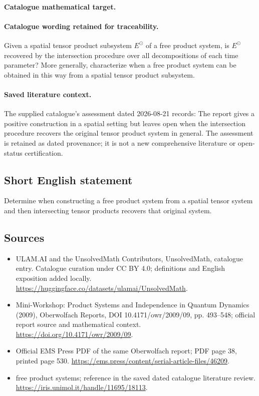 \documentclass[11pt]{article}
\begin{document}
\paragraph{Catalogue mathematical target.}
\paragraph{Catalogue wording retained for traceability.}
Given a spatial tensor product subsystem $E^{\odot}$ of a free product system, is $E^{\odot}$ recovered by the intersection procedure over all decompositions of each time parameter? More generally, characterize when a free product system can be obtained in this way from a spatial tensor product subsystem.

\paragraph{Saved literature context.} The supplied catalogue's assessment dated 2026-08-21 records: The report gives a positive construction in a spatial setting but leaves open when the intersection procedure recovers the original tensor product system in general. The assessment is retained as dated provenance; it is not a new comprehensive literature or open-status certification.
\subsection{Short English statement}
Determine when constructing a free product system from a spatial tensor system and then intersecting tensor products recovers that original system.
\subsection{Sources}
\begin{itemize}
\item[\hypertarget{source:statement:1}{S1}] ULAM.AI and the UnsolvedMath Contributors, UnsolvedMath, catalogue entry. Catalogue curation under CC BY 4.0; definitions and English exposition added locally.
\url{https://huggingface.co/datasets/ulamai/UnsolvedMath}.
\item[\hypertarget{source:statement:2}{S2}] Mini-Workshop: Product Systems and Independence in Quantum Dynamics (2009), Oberwolfach Reports, DOI 10.4171/owr/2009/09, pp. 493--548; official report source and mathematical context.
\url{https://doi.org/10.4171/owr/2009/09}.
\item[\hypertarget{source:statement:3}{S3}] Official EMS Press PDF of the same Oberwolfach report; PDF page 38, printed page 530.
\url{https://ems.press/content/serial-article-files/46209}.
\item[\hypertarget{source:statement:4}{S4}] free product systems; reference in the saved dated catalogue literature review.
\url{https://iris.unimol.it/handle/11695/18113}.
\end{itemize}
\label{end:statement}
\end{document}
